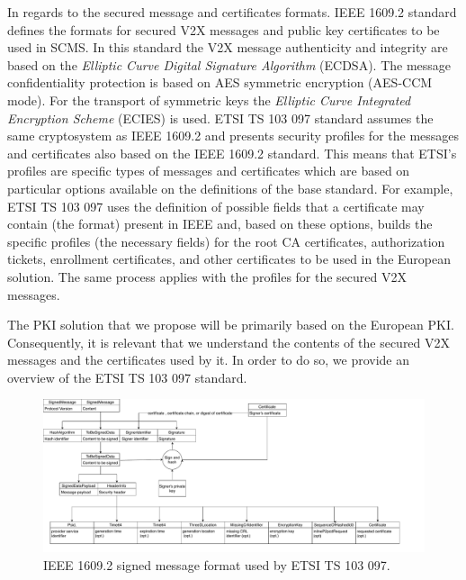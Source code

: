 In regards to the secured message and certificates formats. IEEE 1609.2 \cite{iee_formats} standard defines the formats for secured V2X messages and public key certificates to be used in SCMS. In this standard the V2X message authenticity and integrity are based on the \textit{Elliptic Curve Digital Signature Algorithm} (ECDSA). The message confidentiality protection is based on AES symmetric encryption (AES-CCM mode). For the transport of symmetric keys the \textit{Elliptic Curve Integrated Encryption Scheme} (ECIES) is used. ETSI TS 103 097 standard \cite{etsi_formats} assumes the same cryptosystem as IEEE 1609.2 and presents security profiles for the messages and certificates also based on the IEEE 1609.2 standard. This means that ETSI's profiles are specific types of messages and certificates which are based on particular options available on the definitions of the base standard. For example, ETSI TS 103 097 uses the definition of possible fields that a certificate may contain (the format) present in IEEE and, based on these options, builds the specific profiles (the necessary fields) for the root CA certificates, authorization tickets, enrollment certificates, and other certificates to be used in the European solution. The same process applies with the profiles for the secured V2X messages. 

The PKI solution that we propose will be primarily based on the European PKI. Consequently, it is relevant that we understand the contents of the secured V2X messages and the certificates used by it. In order to do so, we provide an overview of the ETSI TS 103 097 standard. 

\begin{figure}
	\centering
	\includegraphics[width=1.1\textwidth]{Figures/message_format.pdf}
	\caption{\label{fig:signed_message}IEEE 1609.2 signed message format used by ETSI TS 103 097.}
\end{figure}

